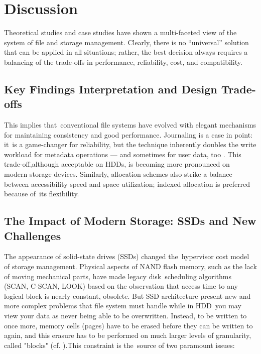 \documentclass[12pt]{article}
\begin{document}

\section{Discussion}
Theoretical studies and case studies have shown a multi-faceted view of the system of file and storage management. Clearly, there is no “universal” solution that can be applied in all situations; rather, the best decision always requires a balancing of the trade-offs in performance, reliability, cost, and compatibility.

\subsection{Key Findings Interpretation and Design Trade-offs}
This implies that conventional file systems have evolved with elegant mechanisms for maintaining consistency and good performance. Journaling is a case in point: it is a game-changer for reliability, but the technique inherently doubles the write workload for metadata operations — and sometimes for user data, too \parencite{Lu2013Extending}. This trade-off,although acceptable on HDDs, is becoming more pronounced on   modern storage devices. Similarly, allocation schemes also strike a balance between accessibility speed and space utilization; indexed allocation is preferred because of its flexibility.

\subsection{The Impact of Modern Storage: SSDs and New Challenges}
The appearance of solid-state drives (SSDs) changed the hypervisor cost model of storage management. Physical aspects of NAND flash memory, such as the lack of moving mechanical parts, have made legacy disk scheduling algorithms (SCAN, C-SCAN, LOOK) based on the observation that access time to any logical block is nearly constant, obsolete.
But SSD architecture present new and more complex problems that file system must handle while in HDD you may view your data as never being able to be overwritten. Instead, to be written to once more, memory cells (pages) have to be erased before they can be written to again, and this erasure has to be performed on much larger levels of granularity, called "blocks" (cf. \parencite{Viking2017AN0035, Lu2013Extending}).This constraint is the source of two paramount issues:
\end{document}
